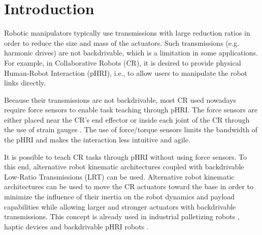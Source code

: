\documentclass[10pt,cleanfoot]{asme2ej}
\begin{document}
\section{Introduction}
Robotic manipulators typically use transmissions with large reduction ratios in order to reduce the size and mass of the actuators. Such transmissions (e.g. harmonic drives) are not backdrivable, which is a limitation in some applications. For example, in Collaborative Robots (CR), it is desired to provide physical Human-Robot Interaction (pHRI), i.e., to allow users to manipulate the robot links directly. 
\par 
Because their transmissions are not backdrivable, most CR used nowadays require force sensors to enable task teaching through pHRI. The force sensors are either placed near the CR's end effector \cite{roveda2018high}\cite{meissner2018smart}\cite{raessa2019teaching} or inside each joint of the CR through the use of strain gauges \cite{loughlin2007dlr}. The use of force/torque sensors limits the bandwidth of the pHRI and makes the interaction less intuitive and agile. 
\par
It is possible to teach CR tasks through pHRI without using force sensors. To this end, alternative robot kinematic architectures coupled with backdrivable Low-Ratio Transmissions (LRT) can be used. Alternative robot kinematic architectures can be used to move the CR actuators toward the base in order to minimize the influence of their inertia on the robot dynamics and payload capabilities while allowing larger and stronger actuators with backdrivable transmissions. This concept is already used in industrial palletizing  robots \cite{xiaoqing2011mechanical}, haptic devices \cite{phantom}  and backdrivable pHRI robots \cite{wen2019kinematically}\cite{9306904}. 
\end{document}
